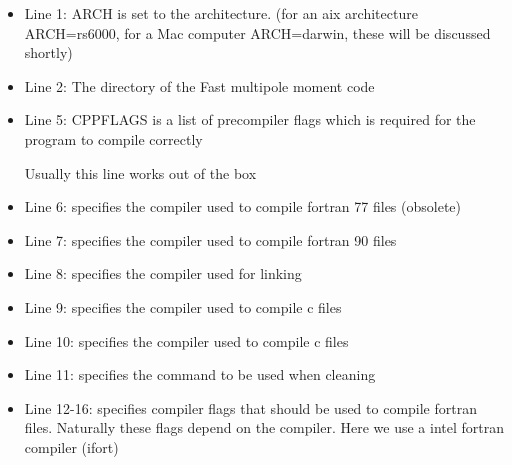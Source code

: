 \begin{itemize}
\item Line 1:  ARCH is set to the architecture. (for an aix architecture ARCH=rs6000, for a Mac computer ARCH=darwin, these will be discussed shortly)
\item Line 2:  The directory of the Fast multipole moment code
\item Line 5:  CPPFLAGS is a list of precompiler flags which is required for the program to compile correctly
  Usually this line works out of the box
\item Line 6:  specifies the compiler used to compile fortran 77 files (obsolete)
\item Line 7:  specifies the compiler used to compile fortran 90 files 
\item Line 8:  specifies the compiler used for linking
\item Line 9:  specifies the compiler used to compile c files
\item Line 10:  specifies the compiler used to compile c files
\item Line 11:  specifies the command to be used when cleaning
\item Line 12-16:  specifies compiler flags that should be used to compile fortran files. Naturally these flags depend on the compiler. Here we use a intel fortran compiler (ifort)
\end{itemize}
